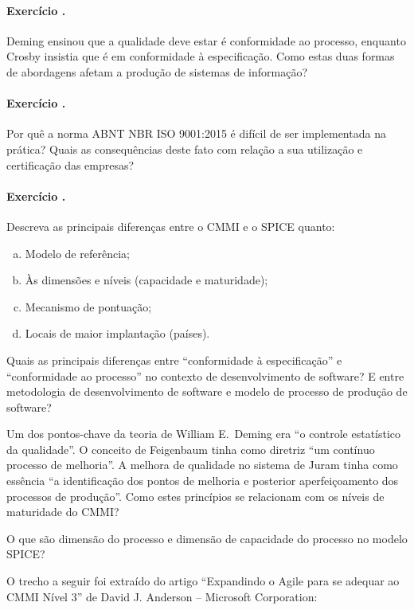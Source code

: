 \paragraph{Exercício \exno.} Deming ensinou que a qualidade deve estar é
conformidade ao processo, enquanto Crosby insistia que é em conformidade à
especificação. Como estas duas formas de abordagens afetam a produção de
sistemas de informação?

\paragraph{Exercício \exno.} Por quê a norma ABNT NBR ISO 9001:2015 é
difícil de ser implementada na prática? Quais as consequências deste
fato com relação a sua utilização e certificação das empresas?

\paragraph{Exercício \exno.} Descreva as principais diferenças entre o
CMMI e o SPICE quanto:

\begin{enumerate}[a)]
\item Modelo de referência;
\item Às dimensões e níveis (capacidade e maturidade);
\item Mecanismo de pontuação;
\item Locais de maior implantação (países).
\end{enumerate}

 Quais as principais diferenças entre ``conformidade à
especificação'' e ``conformidade ao processo'' no contexto de
desenvolvimento de software? E entre metodologia de desenvolvimento de
software e modelo de processo de produção de software?

 Um dos pontos-chave da teoria de William E.\ Deming era
``o controle estatístico da qualidade''. O conceito de Feigenbaum
tinha como diretriz ``um contínuo processo de melhoria''. A melhora de
qualidade no sistema de Juram tinha como essência ``a identificação
dos pontos de melhoria e posterior aperfeiçoamento dos processos de
produção''. Como estes princípios se relacionam com os níveis de
maturidade do CMMI?

 O que são dimensão do processo e dimensão de capacidade
do processo no modelo SPICE? 


 O trecho a seguir foi extraído do artigo 
``Expandindo o Agile para se adequar ao CMMI Nível 3'' de 
David J. Anderson -- Microsoft Corporation:

